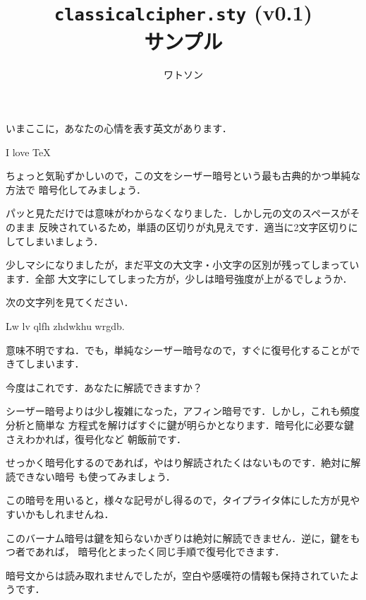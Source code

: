 \documentclass[uplatex]{jsarticle}
\title{\texttt{classicalcipher.sty} (v0.1) \\ サンプル}
\author{ワトソン}
\begin{document}
\maketitle

いまここに，あなたの心情を表す英文があります．
\begin{center}
I love TeX
\end{center}
ちょっと気恥ずかしいので，この文をシーザー暗号という最も古典的かつ単純な方法で
暗号化してみましょう．
\begin{center}
\end{center}
パッと見ただけでは意味がわからなくなりました．しかし元の文のスペースがそのまま
反映されているため，単語の区切りが丸見えです．適当に2文字区切りにしてしまいましょう．
\begin{center}
\end{center}
少しマシになりましたが，まだ平文の大文字・小文字の区別が残ってしまっています．全部
大文字にしてしまった方が，少しは暗号強度が上がるでしょうか．
\begin{center}
\uppercase{}
\end{center}

次の文字列を見てください．
\begin{center}
Lw lv qlfh zhdwkhu wrgdb.
\end{center}
意味不明ですね．でも，単純なシーザー暗号なので，すぐに復号化することができてしまいます．
\begin{center}
\end{center}

今度はこれです．あなたに解読できますか？
\begin{center}
\end{center}
シーザー暗号よりは少し複雑になった，アフィン暗号です．しかし，これも頻度分析と簡単な
方程式を解けばすぐに鍵が明らかとなります．暗号化に必要な鍵さえわかれば，復号化など
朝飯前です．
\begin{center}
\end{center}

せっかく暗号化するのであれば，やはり解読されたくはないものです．絶対に解読できない暗号
も使ってみましょう．
\begin{center}
\end{center}
この暗号を用いると，様々な記号がし得るので，タイプライタ体にした方が見やすいかもしれませんね．
\begin{center}
\ttfamily
{}
\end{center}
このバーナム暗号は鍵を知らないかぎりは絶対に解読できません．逆に，鍵をもつ者であれば，
暗号化とまったく同じ手順で復号化できます．
\begin{center}
\end{center}
暗号文からは読み取れませんでしたが，空白や感嘆符の情報も保持されていたようです．
\begin{center}
\end{center}
\end{document}
